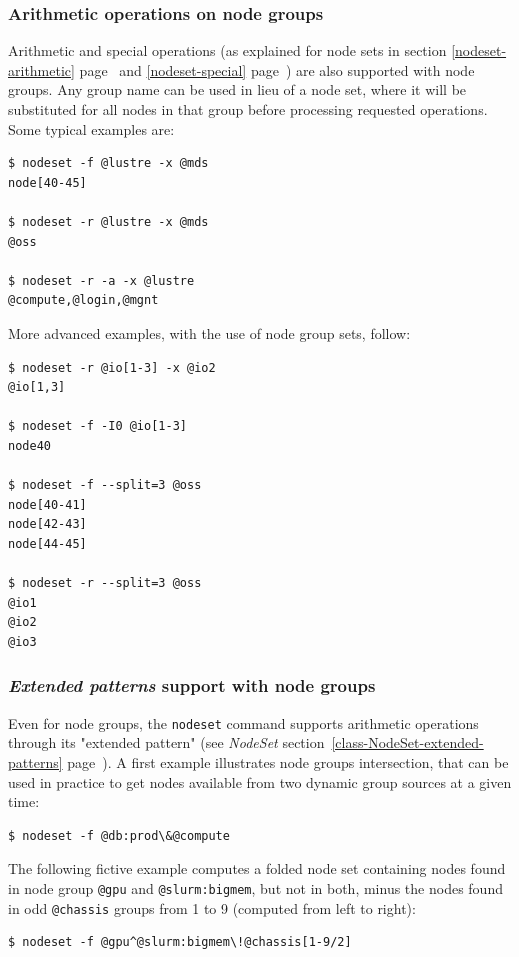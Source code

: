 \documentclass[english,a4paper]{csuserguide}
\newcommand{\NodeSet}{\textit{NodeSet}\xspace}
\newcommand{\nodeset}{\texttt{nodeset}\xspace}
\begin{document}
\subsubsection{Arithmetic operations on node groups}
Arithmetic and special operations (as explained for node sets in section \ref{nodeset-arithmetic} page~\pageref{nodeset-arithmetic} and \ref{nodeset-special} page~\pageref{nodeset-special}) are also supported with node groups. Any group name can be used in lieu of a node set, where it will be substituted for all nodes in that group before processing requested operations. Some typical examples are:
\medskip
\begin{lstlisting}[breaklines=true, breakatwhitespace=true]
$ nodeset -f @lustre -x @mds
node[40-45]

$ nodeset -r @lustre -x @mds
@oss

$ nodeset -r -a -x @lustre
@compute,@login,@mgnt
\end{lstlisting}

More advanced examples, with the use of node group sets, follow:
\medskip
\begin{lstlisting}[breaklines=true, breakatwhitespace=true]
$ nodeset -r @io[1-3] -x @io2
@io[1,3]

$ nodeset -f -I0 @io[1-3]
node40

$ nodeset -f --split=3 @oss
node[40-41]
node[42-43]
node[44-45]

$ nodeset -r --split=3 @oss
@io1
@io2
@io3
\end{lstlisting}

\subsubsection{\textit{Extended patterns} support with node groups}
Even for node groups, the \nodeset command supports arithmetic operations through its "extended pattern" (see \NodeSet section~\ref{class-NodeSet-extended-patterns} page~\pageref{class-NodeSet-extended-patterns}). A first example illustrates node groups intersection, that can be used in practice to get nodes available from two dynamic group sources at a given time:
\medskip
\begin{lstlisting}[breaklines=true, breakatwhitespace=true]
$ nodeset -f @db:prod\&@compute
\end{lstlisting}

The following fictive example computes a folded node set containing nodes found in node group \verb+@gpu+  and \verb+@slurm:bigmem+, 
but not in both, minus the nodes found in odd \verb+@chassis+ groups from 1 to 9 (computed from left to right):
\medskip
\begin{lstlisting}[breaklines=true, breakatwhitespace=true]
$ nodeset -f @gpu^@slurm:bigmem\!@chassis[1-9/2]
\end{lstlisting}
\end{document}
